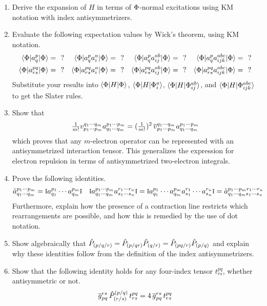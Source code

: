 \documentclass[11pt]{article}
\numberwithin{equation}{section}
\begin{document}
\begin{enumerate}
\item
  Derive the expansion of $H$ in terms of $\Phi $-normal excitations using KM notation with index antisymmetrizers.

\item
  Evaluate the following expectation values by Wick's theorem, using KM notation.
\begin{align*}
  \langle\Phi |a^p_q|\Phi \rangle
=&\
  \,\,?
&
  \langle\Phi |a^p_qa^a_i|\Phi \rangle
=&\
  \,\,?
&
  \langle\Phi |a^p_qa^{ab}_{ij}|\Phi \rangle
=&\
  \,\,?
&
  \langle\Phi |a^p_qa^{abc}_{ijk}|\Phi \rangle
=&\
  \,\,?
\\
  \langle\Phi |a^{pq}_{rs}|\Phi \rangle
=&\
  \,\,?
&
  \langle\Phi |a^{pq}_{rs}a^a_i|\Phi \rangle
=&\
  \,\,?
&
  \langle\Phi |a^{pq}_{rs}a^{ab}_{ij}|\Phi \rangle
=&\
  \,\,?
&
  \langle\Phi |a^{pq}_{rs}a^{abc}_{ijk}|\Phi \rangle
=&\
  \,\,?
\end{align*}
  Substitute your results into $\langle\Phi |H|\Phi \rangle$, $\langle\Phi |H|\Phi _i^a\rangle$, $\langle\Phi |H|\Phi _{ij}^{ab}\rangle$, and $\langle\Phi |H|\Phi _{ijk}^{abc}\rangle$ to get the Slater rules.

\item
  Show that
\begin{align*}
  \tfrac{1}{m!}
  v_{p_1\cdots p_m}^{q_1\cdots q_m}
  a^{p_1\cdots p_m}_{q_1\cdots q_m}
=
  (\tfrac{1}{m!})^2\,
  \overline{v}_{p_1\cdots p_m}^{q_1\cdots q_m}
  a^{p_1\cdots p_m}_{q_1\cdots q_m}
\end{align*}
  which proves that any $m$-electron operator can be represented with an antisymmetrized interaction tensor.
  This generalizes the expression for electron repulsion in terms of antisymmetrized two-electron integrals.

\item
  Prove the following identities.
\begin{align*}
  \tl{a}^{p_1\cd p_m}_{q_1\cd q_m}
=
  \gno{a^{p_1}_{q_1}\cd a^{p_m}_{q_m}}
&&
  \gno{a^{p_1\cd p_m}_{q_1\cd q_m}a^{r_1\cd r_n}_{s_1\cd s_n}}
=
  \gno{a^{p_1}_{q_1}\cd a^{p_m}_{q_m}a^{r_1}_{s_1}\cd a^{r_n}_{s_n}}
=
  \tl{a}^{p_1\cd p_mr_1\cd r_n}_{q_1\cd q_ms_1\cd s_n}
\end{align*}
  Furthermore, explain how the presence of a contraction line restricts which rearrangements are possible, and how this is remedied by the use of dot notation.

\item
  Show algebraically that $\hat{P}_{(p/q/r)}=\hat{P}_{(p/qr)}\hat{P}_{(q/r)}=\hat{P}_{(pq/r)}\hat{P}_{(p/q)}$ and explain why these identities follow from the definition of the index antisymmetrizers.

\item
  Show that the following identity holds for any four-index tensor $t^{pq}_{rs}$, whether antisymmetric or not.
  \begin{align*}
    \overline{g}_{pq}^{rs}\,
    \hat{P}^{(p/q)}_{(r/s)}\,
    t^{pq}_{rs}
  =
    4\,
    \overline{g}_{pq}^{rs}\,
    t^{pq}_{rs}
  \end{align*}


\end{enumerate}
\end{document}
